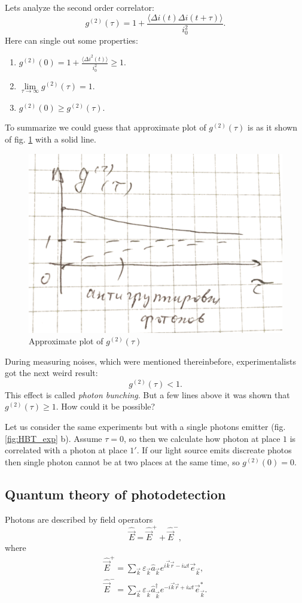 Lets analyze the second order correlator:
\begin{equation}
	g^{(2)} (\tau) = 1 + \frac{\langle \Delta i(t) \Delta i (t + \tau) \rangle}{i_0^2}.
\end{equation}
Here can single out some properties:
\begin{enumerate}
	\item $g^{(2)}(0) = 1 + \frac{\langle \Delta i^2 (t) \rangle}{i_0^2} \geq 1 $.
	\item $\lim\limits_{\tau \to \infty} g^{(2)}(\tau) = 1$.
	\item $g^{(2)}(0) \geq g^{(2)}(\tau)$. 
\end{enumerate}
To summarize we could guess that approximate plot of $g^{(2)}(\tau)$ is as it shown of fig. \ref{fig:g2tau_apprx} with a solid line.
\begin{figure}[h!]
	\centering
	\includegraphics[width=0.4\linewidth]{fig/L3/g2tau_apprx}
	\caption{Approximate plot of $g^{(2)}(\tau)$}
	\label{fig:g2tau_apprx}
\end{figure}

During measuring noises, which were mentioned thereinbefore, experimentalists got the next weird result:
\begin{equation}
	g^{(2)}(\tau) < 1.
\end{equation}
This effect is called \textit{photon bunching}. But a few lines above it was shown that $g^{(2)}(\tau) \geq 1$. How could it be possible? 

Let us consider the same experiments but with a single photons emitter (fig. \ref{fig:HBT_exp} b). Assume $\tau = 0$, so then we calculate how photon at place $1$ is correlated with a photon at place $1'$. If our light source emits discreate photos then single photon cannot be at two places at the same time, so $g^{(2)}(0) = 0$.

\subsection{Quantum theory of photodetection}

Photons are described by field operators
\begin{equation}
	\hat{\vec{E}} = \hat{\vec{E}}^+ + \hat{\vec{E}}^-,
\end{equation}
where
\begin{eqnarray}
	\hat{\vec{E}}^+ = \sum_{\vec{k}} \varepsilon_{\vec{k}} \hat{a}_{\vec{k}} e^{i \vec{k} \vec{r} - i \omega t} \vec{e}_{\vec{k}}, \\
	\hat{\vec{E}}^- = \sum_{\vec{k}} \varepsilon_{\vec{k}} \hat{a}^{\dagger}_{\vec{k}} e^{-i \vec{k} \vec{r} + i \omega t} \vec{e}^*_{\vec{k}}.
\end{eqnarray}

